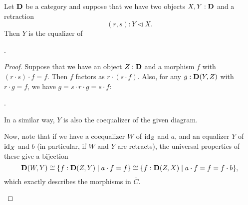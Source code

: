 \begin{lemma}\label{rem:retract-coequalizer}
  Let $ \mathbf{D} $ be a category and suppose that we have two objects $ X, Y : \mathbf{D} $ and a retraction
  \[ (r, s) : Y \triangleleft X. \]
  Then $ Y $ is the equalizer of .
\end{lemma}
\begin{proof}
  Suppose that we have an object $ Z: \mathbf{D} $ and a morphism $ f $ with $ (r \cdot s) \cdot f = f $. Then $ f $ factors as $ r \cdot (s \cdot f) $. Also, for any $ g: \mathbf{D}(Y, Z) $ with $ r \cdot g = f $, we have $ g = s \cdot r \cdot g = s \cdot f $:
  \begin{center}
    .
  \end{center}

  In a similar way, $ Y $ is also the coequalizer of the given diagram.

  Now, note that if we have a coequalizer $ W $ of $ \text{id}_{Z} $ and $ a $, and an equalizer $ Y $ of $ \text{id}_{X} $ and $ b $ (in particular, if $ W $ and $ Y $ are retracts), the universal properties of these give a bijection
  \[ \mathbf{D}(W, Y) \cong \{ f: \mathbf{D}(Z, Y) \mid a \cdot f = f \} \cong \{ f: \mathbf{D}(Z, X) \mid a \cdot f = f = f \cdot b \}, \]
  which exactly describes the morphisms in $ \bar C $.
  \begin{center}
  \end{center}
\end{proof}

